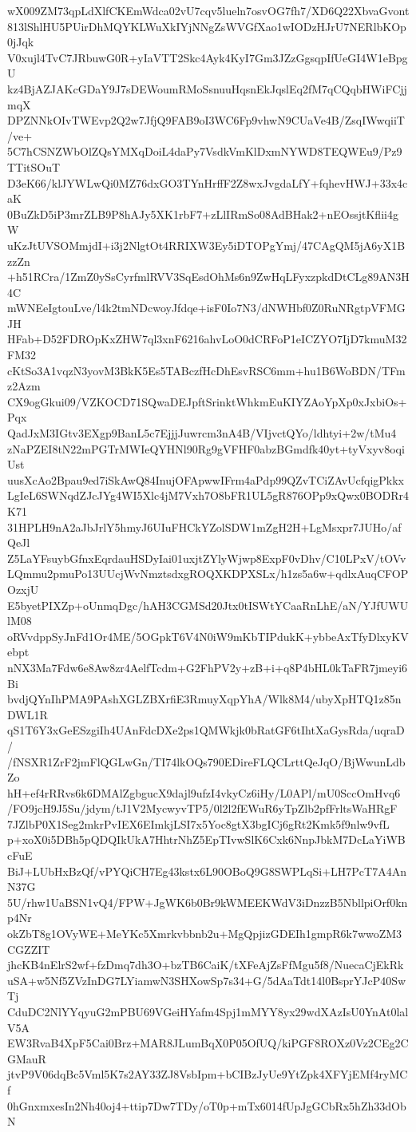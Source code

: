 wX009ZM73qpLdXlfCKEmWdca02vU7cqv5lueln7osvOG7fh7/XD6Q22XbvaGvont
813lShlHU5PUirDhMQYKLWuXkIYjNNgZsWVGfXao1wIODzHJrU7NERlbKOp0jJqk
V0xujl4TvC7JRbuwG0R+yIaVTT2Skc4Ayk4KyI7Gm3JZzGgsqpIfUeGI4W1eBpgU
kz4BjAZJAKcGDaY9J7sDEWoumRMoSsnuuHqsnEkJqslEq2fM7qCQqbHWiFCjjmqX
DPZNNkOIvTWEvp2Q2w7JfjQ9FAB9oI3WC6Fp9vhwN9CUaVe4B/ZsqIWwqiiT/ve+
5C7hCSNZWbOlZQsYMXqDoiL4daPy7VsdkVmKlDxmNYWD8TEQWEu9/Pz9TTitSOuT
D3eK66/klJYWLwQi0MZ76dxGO3TYnHrffF2Z8wxJvgdaLfY+fqhevHWJ+33x4caK
0BuZkD5iP3mrZLB9P8hAJy5XK1rbF7+zLlIRmSo08AdBHak2+nEOssjtKflii4gW
uKzJtUVSOMmjdI+i3j2NlgtOt4RRIXW3Ey5iDTOPgYmj/47CAgQM5jA6yX1BzzZn
+h51RCra/1ZmZ0ySsCyrfmlRVV3SqEsdOhMs6n9ZwHqLFyxzpkdDtCLg89AN3H4C
mWNEeIgtouLve/l4k2tmNDcwoyJfdqe+isF0Io7N3/dNWHbf0Z0RuNRgtpVFMGJH
HFab+D52FDROpKxZHW7ql3xnF6216ahvLoO0dCRFoP1eICZYO7IjD7kmuM32FM32
cKtSo3A1vqzN3yovM3BkK5Es5TABczfHcDhEsvRSC6mm+hu1B6WoBDN/TFmz2Azm
CX9ogGkui09/VZKOCD71SQwaDEJpftSrinktWhkmEuKIYZAoYpXp0xJxbiOs+Pqx
QadJxM3IGtv3EXgp9BanL5c7EjjjJuwrcm3nA4B/VIjvctQYo/ldhtyi+2w/tMu4
zNaPZEI8tN22mPGTrMWIeQYHNl90Rg9gVFHF0abzBGmdfk40yt+tyVxyv8oqiUst
uusXcAo2Bpau9ed7iSkAwQ84InujOFApwwIFrm4aPdp99QZvTCiZAvUcfqigPkkx
LgIeL6SWNqdZJcJYg4WI5Xlc4jM7Vxh7O8bFR1UL5gR876OPp9xQwx0BODRr4K71
31HPLH9nA2aJbJrlY5hmyJ6UIuFHCkYZolSDW1mZgH2H+LgMsxpr7JUHo/afQeJl
Z5LaYFsuybGfnxEqrdauHSDyIai01uxjtZYlyWjwp8ExpF0vDhv/C10LPxV/tOVv
LQmmu2pmuPo13UUcjWvNmztsdxgROQXKDPXSLx/h1zs5a6w+qdlxAuqCFOPOzxjU
E5byetPIXZp+oUnmqDgc/hAH3CGMSd20Jtx0tISWtYCaaRnLhE/aN/YJfUWUlM08
oRVvdppSyJnFd1Or4ME/5OGpkT6V4N0iW9mKbTIPdukK+ybbeAxTfyDlxyKVebpt
nNX3Ma7Fdw6e8Aw8zr4AelfTcdm+G2FhPV2y+zB+i+q8P4bHL0kTaFR7jmeyi6Bi
bvdjQYnIhPMA9PAshXGLZBXrfiE3RmuyXqpYhA/Wlk8M4/ubyXpHTQ1z85nDWL1R
qS1T6Y3xGeESzgiIh4UAnFdcDXe2ps1QMWkjk0bRatGF6tIhtXaGysRda/uqraD/
/fNSXR1ZrF2jmFlQGLwGn/TI74lkOQs790EDireFLQCLrttQeJqO/BjWwunLdbZo
hH+ef4rRRvs6k6DMAlZgbgucX9dajl9ufzI4vkyCz6iHy/L0APl/mU0SccOmHvq6
/FO9jcH9J5Su/jdym/tJ1V2MycwyvTP5/0l2l2fEWuR6yTpZlb2pfFrltsWaHRgF
7JZlbP0X1Seg2mkrPvIEX6EImkjLSI7x5Yoc8gtX3bgICj6gRt2Kmk5f9nlw9vfL
p+xoX0i5DBh5pQDQIkUkA7HhtrNhZ5EpTIvwSlK6Cxk6NnpJbkM7DcLaYiWBcFuE
BiJ+LUbHxBzQf/vPYQiCH7Eg43kstx6L90OBoQ9G8SWPLqSi+LH7PcT7A4AnN37G
5U/rhw1UaBSN1vQ4/FPW+JgWK6b0Br9kWMEEKWdV3iDnzzB5NbllpiOrf0knp4Nr
okZbT8g1OVyWE+MeYKc5Xmrkvbbnb2u+MgQpjizGDEIh1gmpR6k7wwoZM3CGZZIT
jhcKB4nElrS2wf+fzDmq7dh3O+bzTB6CaiK/tXFeAjZsFfMgu5f8/NuecaCjEkRk
uSA+w5Nf5ZVzInDG7LYiamwN3SHXowSp7s34+G/5dAaTdt14l0BsprYJcP40SwTj
CduDC2NlYYqyuG2mPBU69VGeiHYafm4Spj1mMYY8yx29wdXAzIsU0YnAt0lalV5A
EW3RvaB4XpF5Cai0Brz+MAR8JLumBqX0P05OfUQ/kiPGF8ROXz0Vz2CEg2CGMauR
jtvP9V06dqBc5Vml5K7s2AY33ZJ8VsbIpm+bCIBzJyUe9YtZpk4XFYjEMf4ryMCf
0hGnxmxesIn2Nh40oj4+ttip7Dw7TDy/oT0p+mTx6014fUpJgGCbRx5hZh33dObN
